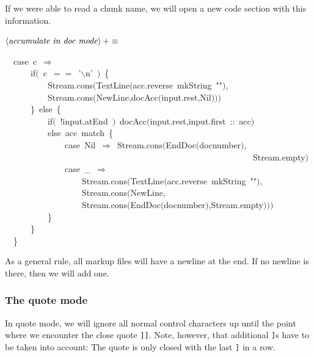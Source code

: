 \documentclass[a4paper,12pt]{article}
\begin{document}
If we were able to read a chunk name, we will open a new code section
with this information.

$\left<\mbox{\emph{accumulate in doc mode}}\right>+\equiv$
\begin{program}~~{\vem case}~c~$\Rightarrow$
\\~~~~~~{\vem if}$($~c~$==$~'$\backslash$n'~$)$~{\small\{}
\\~~~~~~~~~~Stream.cons$($TextLine$($acc.reverse~mkString~""$)$,
\\~~~~~~~~~~Stream.cons$($NewLine,docAcc$($input.rest,Nil$)$$)$$)$
\\~~~~~~{\small\}}~{\vem else}~{\small\{}
\\~~~~~~~~~~{\vem if}$($~!input.atEnd~$)$~docAcc$($input.rest,input.first~{\rm :}{\rm :}~acc$)$
\\~~~~~~~~~~{\vem else}~acc~{\vem match}~{\small\{}
\\~~~~~~~~~~~~~~{\vem case}~Nil~$\Rightarrow$~Stream.cons$($EndDoc$($docnumber$)$,
\\~~~~~~~~~~~~~~~~~~~~~~~~~~~~~~~~~~~~~~~~~~~~~~~~~~~~~~~~~~Stream.empty$)$
\\~~~~~~~~~~~~~~{\vem case}~\_~$\Rightarrow$
\\~~~~~~~~~~~~~~~~~~Stream.cons$($TextLine$($acc.reverse~mkString~""$)$,
\\~~~~~~~~~~~~~~~~~~Stream.cons$($NewLine,
\\~~~~~~~~~~~~~~~~~~Stream.cons$($EndDoc$($docnumber$)$,Stream.empty$)$$)$$)$
\\~~~~~~~~~~{\small\}}
\\~~~~~~{\small\}}
\\~~{\small\}}
\\[0.5em]\end{program}


As a general rule, all markup files will have a newline at the end. If
no newline is there, then we will add one.

\subsubsection{The quote mode}
In quote mode, we will ignore all normal control characters up until the
point where we encounter the close quote \texttt{]]}. Note, however, that additional
\texttt{]}s have to be taken into account: The quote is only closed with the
last \texttt{]} in a row.
\end{document}
